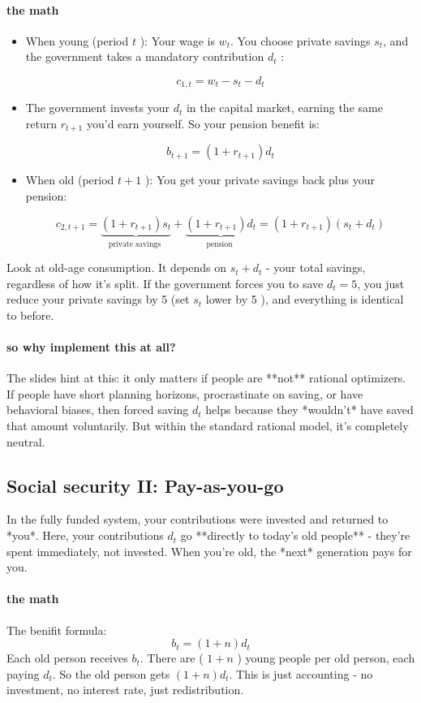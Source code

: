 \documentclass[12pt]{article}
\begin{document}
\paragraph{the math}
\begin{itemize}
    \item When young (period $t$ ): Your wage is $w_t$. You choose private savings $s_t$, and the government takes a mandatory contribution $d_t$ :

$$
c_{1, t}=w_t-s_t-d_t
$$
\item The government invests your $d_t$ in the capital market, earning the same return $r_{t+1}$ you'd earn yourself. So your pension benefit is:

$$
b_{t+1}=\left(1+r_{t+1}\right) d_t
$$
\item When old (period $t+1$ ): You get your private savings back plus your pension:

$$
c_{2, t+1}=\underbrace{\left(1+r_{t+1}\right) s_t}_{\text {private savings }}+\underbrace{\left(1+r_{t+1}\right) d_t}_{\text {pension }}=\left(1+r_{t+1}\right)\left(s_t+d_t\right)
$$
\end{itemize}
Look at old-age consumption. It depends on $s_t+d_t$ - your total savings, regardless of how it's split. If the government forces you to save $d_t=5$, you just reduce your private savings by 5 (set $s_t$ lower by 5 ), and everything is identical to before.
\paragraph{so why implement this at all?}
The slides hint at this: it only matters if people are **not** rational optimizers. If people have short planning horizons, procrastinate on saving, or have behavioral biases, then forced saving $d_t$ helps because they *wouldn't* have saved that amount voluntarily. But within the standard rational model, it's completely neutral.

\subsection{Social security II: Pay-as-you-go}
In the fully funded system, your contributions were invested and returned to *you*. Here, your contributions $d_t$ go **directly to today's old people** - they're spent immediately, not invested. When you're old, the *next* generation pays for you.
\paragraph{the math}
The benifit formula: 
$$
b_t=(1+n) d_t
$$
Each old person receives $b_t$. There are ( $1+n$ ) young people per old person, each paying $d_t$. So the old person gets $(1+n) d_t$. This is just accounting - no investment, no interest rate, just redistribution.
\end{document}
